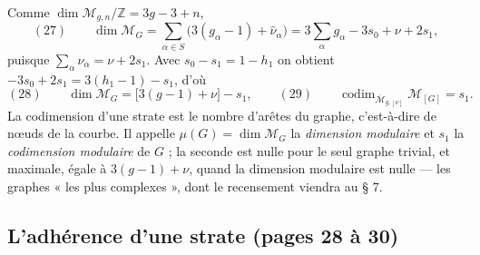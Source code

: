 \documentclass[11pt,a4paper]{article}
\begin{document}
Comme $\dim \mathcal{M}_{g,n}/\mathbb{Z} = 3g - 3 + n$,
\[
(27) \qquad \dim \mathcal{M}_G = \sum_{\alpha \in S} \bigl(3(g_\alpha - 1) +
\widehat{\nu}_\alpha\bigr) = 3 \sum_\alpha g_\alpha - 3 s_0 + \nu + 2 s_1 ,
\]
puisque $\sum_\alpha \widehat{\nu}_\alpha = \nu + 2 s_1$. Avec $s_0 - s_1 = 1 -
h_1$ on obtient $-3s_0 + 2s_1 = 3(h_1 - 1) - s_1$, d'où
\[
(28) \qquad \dim \mathcal{M}_G = \bigl[3(g - 1) + \nu\bigr] - s_1, \qquad
(29) \qquad \operatorname{codim}_{\overline{\mathcal{M}}_{g,[\nu]}}
\mathcal{M}_{[G]} = s_1 .
\]
La codimension d'une strate est le nombre d'arêtes du graphe, c'est-à-dire de
nœuds de la courbe. Il appelle $\mu(G) = \dim \mathcal{M}_G$ la \emph{dimension
modulaire} et $s_1$ la \emph{codimension modulaire} de $G$ ; la seconde est nulle
pour le seul graphe trivial, et maximale, égale à $3(g-1) + \nu$, quand la
dimension modulaire est nulle — les graphes « les plus complexes », dont le
recensement viendra au § 7.

\subsection*{L'adhérence d'une strate (pages 28 à 30)}
\end{document}
